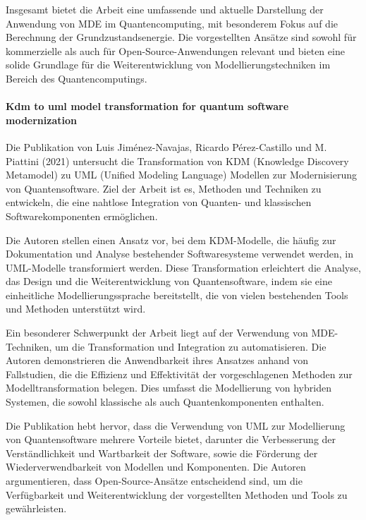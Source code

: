Insgesamt bietet die Arbeit eine umfassende und aktuelle Darstellung der Anwendung von MDE im Quantencomputing, mit 
besonderem Fokus auf die Berechnung der Grundzustandsenergie. Die vorgestellten Ansätze sind sowohl für kommerzielle 
als auch für Open-Source-Anwendungen relevant und bieten eine solide Grundlage für die Weiterentwicklung von 
Modellierungstechniken im Bereich des Quantencomputings.

\paragraph{Kdm to uml model transformation for quantum software modernization}

Die Publikation von Luis Jiménez-Navajas, Ricardo Pérez-Castillo und M. Piattini (2021) \cite{jimenez2021kdm} untersucht die Transformation 
von KDM (Knowledge Discovery Metamodel) zu UML (Unified Modeling Language) Modellen zur Modernisierung von 
Quantensoftware. Ziel der Arbeit ist es, Methoden und Techniken zu entwickeln, die eine nahtlose Integration 
von Quanten- und klassischen Softwarekomponenten ermöglichen.

Die Autoren stellen einen Ansatz vor, bei dem KDM-Modelle, die häufig zur Dokumentation und Analyse bestehender 
Softwaresysteme verwendet werden, in UML-Modelle transformiert werden. Diese Transformation erleichtert die 
Analyse, das Design und die Weiterentwicklung von Quantensoftware, indem sie eine einheitliche Modellierungssprache 
bereitstellt, die von vielen bestehenden Tools und Methoden unterstützt wird.

Ein besonderer Schwerpunkt der Arbeit liegt auf der Verwendung von MDE-Techniken, um die Transformation und 
Integration zu automatisieren. Die Autoren demonstrieren die Anwendbarkeit ihres Ansatzes anhand von Fallstudien, 
die die Effizienz und Effektivität der vorgeschlagenen Methoden zur Modelltransformation belegen. Dies umfasst 
die Modellierung von hybriden Systemen, die sowohl klassische als auch Quantenkomponenten enthalten.

Die Publikation hebt hervor, dass die Verwendung von UML zur Modellierung von Quantensoftware mehrere Vorteile 
bietet, darunter die Verbesserung der Verständlichkeit und Wartbarkeit der Software, sowie die Förderung der 
Wiederverwendbarkeit von Modellen und Komponenten. Die Autoren argumentieren, dass Open-Source-Ansätze entscheidend 
sind, um die Verfügbarkeit und Weiterentwicklung der vorgestellten Methoden und Tools zu gewährleisten.

